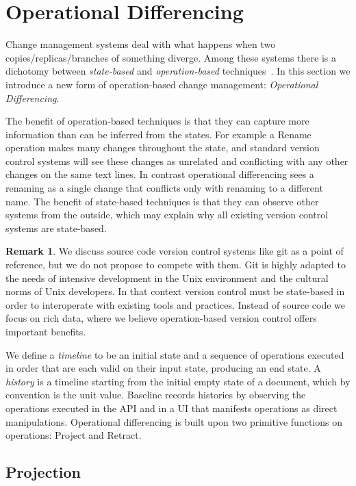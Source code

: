 \documentclass[english,submission]{programming}
\theoremstyle{definition}
\newtheorem*{remark}{Remark}
\begin{document}
\section{Operational Differencing}

Change management systems deal with what happens when two copies/replicas/branches of something diverge.
Among these systems there is a dichotomy between \textit{state-based} and \textit{operation-based} techniques~\cite{diff3, Shapiro11, edit-lenses}.
In this section we introduce a new form of operation-based change management: \textit{Operational Differencing}.

The benefit of operation-based techniques is that they can capture more information than can be inferred from the states.
For example a \textsf{Rename} operation makes many changes throughout the state, and standard version control systems will see these changes as unrelated and conflicting with any other changes on the same text lines. In contrast operational differencing sees a renaming as a single change that conflicts only with renaming to a different name.
The benefit of state-based techniques is that they can observe other systems from the outside, which may explain why all existing version control systems are state-based.

\begin{remark}
We discuss source code version control systems like git as a point of reference, but we do not propose to compete with them. Git is highly adapted to the needs of intensive development in the Unix environment and the cultural norms of Unix developers. In that context version control must be state-based in order to interoperate with existing tools and practices. Instead of source code we focus on rich data, where we believe operation-based version control offers important benefits.
\end{remark}

We define a \textit{timeline} to be an initial state and a sequence of operations executed in order that are each valid on their input state, producing an end state.
A \textit{history} is a timeline starting from the initial empty state of a document, which by convention is the unit value.
Baseline records histories by observing the operations executed in the API and in a UI that manifests operations as direct manipulations. Operational differencing is built upon two primitive functions on operations: \textsf{Project} and \textsf{Retract}.

\subsection{Projection}
\end{document}
